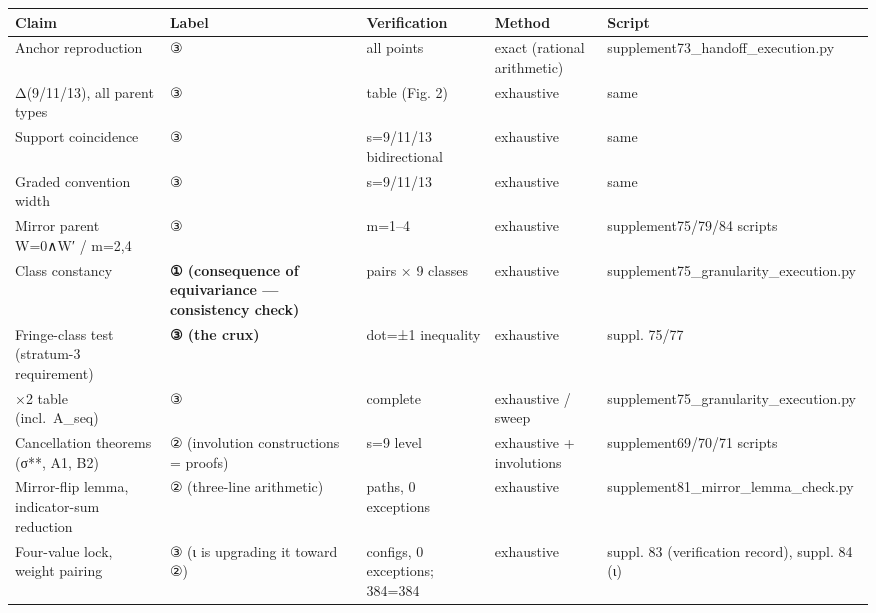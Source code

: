 \documentclass[
]{ltjsarticle}
\newcounter{none} %
\begin{document}
{\def\LTcaptype{none} %
\begin{longtable}[]{@{}
  >{\raggedright\arraybackslash}p{}
  >{\raggedright\arraybackslash}p{}
  >{\raggedright\arraybackslash}p{}
  >{\raggedright\arraybackslash}p{}
  >{\raggedright\arraybackslash}p{}@{}}
\toprule\noalign{}
\begin{minipage}[b]{\linewidth}\raggedright
Claim
\end{minipage} & \begin{minipage}[b]{\linewidth}\raggedright
Label
\end{minipage} & \begin{minipage}[b]{\linewidth}\raggedright
Verification
\end{minipage} & \begin{minipage}[b]{\linewidth}\raggedright
Method
\end{minipage} & \begin{minipage}[b]{\linewidth}\raggedright
Script
\end{minipage} \\
\midrule\noalign{}
\endhead
\bottomrule\noalign{}
\endlastfoot
Anchor reproduction & ③ & all points & exact (rational arithmetic) &
supplement73\_handoff\_execution.py \\
Δ(9/11/13), all parent types & ③ & table (Fig. 2) & exhaustive & same \\
Support coincidence & ③ & s=9/11/13 bidirectional & exhaustive & same \\
Graded convention width & ③ & s=9/11/13 & exhaustive & same \\
Mirror parent W=0∧W′ / m=2,4 & ③ & m=1--4 & exhaustive &
supplement75/79/84 scripts \\
Class constancy & \textbf{① (consequence of equivariance --- consistency
check)} & 23 pairs × 9 classes & exhaustive &
supplement75\_granularity\_execution.py \\
Fringe-class test (stratum-3 requirement) & \textbf{③ (the crux)} &
dot=±1 inequality & exhaustive & suppl. 75/77 \\
2×2 table (incl.~A\_seq) & ③ & complete & exhaustive / sweep &
supplement75\_granularity\_execution.py \\
Cancellation theorems (σ**, A1, B2) & ② (involution constructions =
proofs) & s=9 level & exhaustive + involutions & supplement69/70/71
scripts \\
Mirror-flip lemma, indicator-sum reduction & ② (three-line arithmetic) &
394 paths, 0 exceptions & exhaustive &
supplement81\_mirror\_lemma\_check.py \\
Four-value lock, weight pairing & ③ (ι is upgrading it toward ②) & 36
configs, 0 exceptions; 384=384 & exhaustive & suppl. 83 (verification
record), suppl. 84 (ι) \\
\end{longtable}
}
\end{document}
